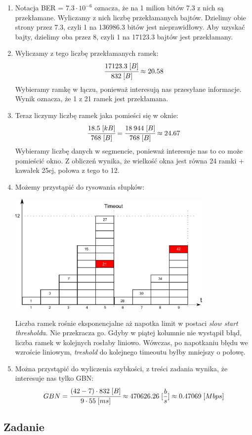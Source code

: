 \documentclass[a4paper,twoside]{article}
\begin{document}
\begin{enumerate}
	\item Notacja BER = $ 7.3 \cdot 10 ^ {-6} $ oznacza, że na 1 milion bitów 7.3 z nich są przekłamane. Wyliczamy z nich liczbę przekłamanych bajtów. Dzielimy obie strony przez 7.3, czyli 1 na 136986.3 bitów jest nieprawidłowy. Aby uzyskać bajty, dzielimy oba przez 8, czyli 1 na 17123.3 bajtów jest przekłamany.
	\item Wyliczamy z tego liczbę przekłamanych ramek:
	$$ \cfrac{17123.3\;[B]}{832\;[B]}\approx20.58 $$
	Wybieramy ramkę w łączu, ponieważ interesują nas przesyłane informacje. Wynik oznacza, że 1 z 21 ramek jest przekłamana.
	\item Teraz liczymy liczbę ramek jaka pomieści się w oknie:
	$$ \cfrac{18.5\;[kB]}{768\;[B]}=\cfrac{18\:944\;[B]}{768\;[B]}\approx24.67 $$
	Wybieramy liczbę danych w segmencie, ponieważ interesuje nas to co może pomieścić okno. Z obliczeń wynika, że wielkość okna jest równa 24 ramki + kawałek 25ej, połowa z tego to 12.
	\item Możemy przystąpić do rysowania słupków:
	\begin{center}
		\includegraphics[width=10.0cm]{./images/zadanie16}
	\end{center}
	Liczba ramek rośnie eksponencjalne aż napotka limit w postaci \emph{slow start threshold}u. Nie przekracza go. Gdyby w piątej kolumnie nie wystąpił błąd, liczba ramek w kolejnych rosłaby liniowo. Wówczas, po napotkaniu błędu we wzroście liniowym, \emph{treshold} do kolejnego timeoutu byłby mniejszy o połowę.
	\item Można przystąpić do wyliczenia szybkości, z treści zadania wynika, że interesuje nas tylko GBN:
	$$ GBN=\cfrac{(42-7)\cdot832\;[B]}{9\cdot55\;[ms]}\approx470626.26\;[\frac{b}{s}]\approx0.47069\;[Mbps]   $$
\end{enumerate}


\newpage
\subsection{Zadanie}
\end{document}
